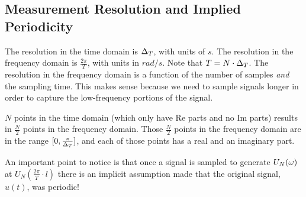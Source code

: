 \subsection{Measurement Resolution and Implied Periodicity}
\label{sec:impliedperiodicity}
The resolution in the time domain is $\Delta_T$, with units of $s$. The resolution in the frequency domain is $\frac{2\pi}{T}$, with units in $rad/s$. Note that $T=N\cdot\Delta_T$. The resolution in the frequency domain is a function of the number of samples \textit{and} the sampling time. This makes sense because  we need to sample signals longer in order to capture the low-frequency portions of the signal.

$N$ points in the time domain (which only have $\text{Re}$ parts and no $\text{Im}$ parts) results in $\frac{N}{2}$ points in the frequency domain. Those $\frac{N}{2}$ points in the frequency domain are in the range $[0,\frac{\pi}{\Delta_T}]$, and each of those points has a real and an imaginary part.

An important point to notice is that once a signal is sampled to generate $U_N(\omega)$ at $U_N(\frac{2\pi}{T}\cdot l)$ there is an implicit assumption made that the original signal, $u(t)$, was periodic!

